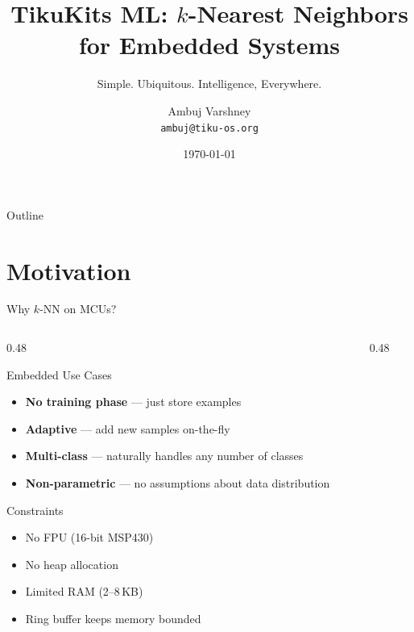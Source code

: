 \documentclass[aspectratio=169, 10pt]{beamer}
\title[TikuKits ML]{TikuKits ML: $k$-Nearest Neighbors for Embedded Systems}
\subtitle{Simple. Ubiquitous. Intelligence, Everywhere.}
\author[Ambuj Varshney]{Ambuj Varshney \\ \texttt{ambuj@tiku-os.org}}
\date{\today}
\begin{document}
\begin{frame}
\titlepage
\end{frame}

\begin{frame}{Outline}
\tableofcontents
\end{frame}

\section{Motivation}

\begin{frame}{Why $k$-NN on MCUs?}
\begin{columns}[T]
\begin{column}{0.48\textwidth}
\begin{block}{Embedded Use Cases}
\begin{itemize}
  \item \textbf{No training phase} --- just store examples
  \item \textbf{Adaptive} --- add new samples on-the-fly
  \item \textbf{Multi-class} --- naturally handles any number of classes
  \item \textbf{Non-parametric} --- no assumptions about data distribution
\end{itemize}
\end{block}

\begin{block}{Constraints}
\begin{itemize}
  \item No FPU (16-bit MSP430)
  \item No heap allocation
  \item Limited RAM (2--8\,KB)
  \item Ring buffer keeps memory bounded
\end{itemize}
\end{block}
\end{column}

\begin{column}{0.48\textwidth}
\begin{center}
\end{center}
\end{column}
\end{columns}
\end{frame}
\end{document}
